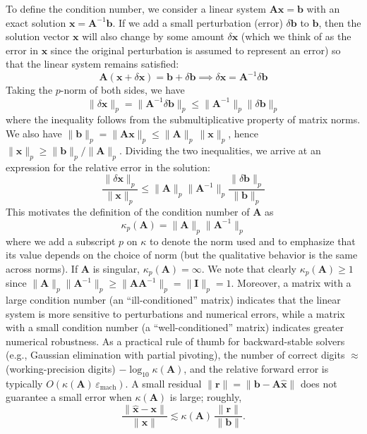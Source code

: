 To define the condition number, we consider a linear system $ \mathbf{A}\mathbf{x} = \mathbf{b} $ with an exact solution $ \mathbf{x} = \mathbf{A}^{-1}\mathbf{b} $. If we add a small perturbation (error) $\delta\mathbf{b}$ to $\mathbf{b}$, then the solution vector $\mathbf{x}$ will also change by some amount $\delta\mathbf{x}$ (which we think of as the error in $\mathbf{x}$ since the original perturbation is assumed to represent an error) so that the linear system remains satisfied:
\begin{equation*}
    \mathbf{A}\left(\mathbf{x} + \delta\mathbf{x}\right) = \mathbf{b} + \delta\mathbf{b}
    \implies 
    \delta\mathbf{x} = \mathbf{A}^{-1}\delta\mathbf{b}
\end{equation*}
Taking the $p$-norm of both sides, we have
\begin{equation*}
    \|\delta\mathbf{x}\|_p = \|\mathbf{A}^{-1}\delta\mathbf{b}\|_p \leq \|\mathbf{A}^{-1}\|_p \|\delta\mathbf{b}\|_p
\end{equation*}
where the inequality follows from the submultiplicative property of matrix norms. We also have $\|\mathbf{b}\|_p = \|\mathbf{A}\mathbf{x}\|_p \le \|\mathbf{A}\|_p \, \|\mathbf{x}\|_p$, hence $\|\mathbf{x}\|_p \ge \|\mathbf{b}\|_p/\|\mathbf{A}\|_p$. Dividing the two inequalities, we arrive at an expression for the relative error in the solution:
\begin{equation*}
    \frac{\|\delta\mathbf{x}\|_p}{\|\mathbf{x}\|_p} \leq \|\mathbf{A}\|_p \|\mathbf{A}^{-1}\|_p \frac{\|\delta\mathbf{b}\|_p}{\|\mathbf{b}\|_p}
\end{equation*}
This motivates the definition of the condition number of $\mathbf{A}$ as
\begin{equation*}
    \kappa_p(\mathbf{A}) = \|\mathbf{A}\|_p \|\mathbf{A}^{-1}\|_p
\end{equation*}
where we add a subscript $p$ on $\kappa$ to denote the norm used and to emphasize that its value depends on the choice of norm (but the qualitative behavior is the same across norms). If $\mathbf{A}$ is singular, $\kappa_p(\mathbf{A}) = \infty$. We note that clearly $\kappa_p(\mathbf{A}) \geq 1$ since $\|\mathbf{A}\|_p \|\mathbf{A}^{-1}\|_p \geq \|\mathbf{A} \mathbf{A}^{-1}\|_p = \|\mathbf{I}\|_p = 1$. Moreover, a matrix with a large condition number (an ``ill-conditioned'' matrix) indicates that the linear system is more sensitive to perturbations and numerical errors, while a matrix with a small condition number (a ``well-conditioned'' matrix) indicates greater numerical robustness. As a practical rule of thumb for backward-stable solvers (e.g., Gaussian elimination with partial pivoting), the number of correct digits $\approx$ (working-precision digits) $-\log_{10}\kappa(\mathbf{A})$, and the relative forward error is typically $O(\kappa(\mathbf{A})\,\varepsilon_{\mathrm{mach}})$. A small residual $\|\mathbf{r}\| = \|\mathbf{b}-\mathbf{A}\hat{\mathbf{x}}\|$ does not guarantee a small error when $\kappa(\mathbf{A})$ is large; roughly,
\[ \frac{\|\hat{\mathbf{x}}-\mathbf{x}\|}{\|\mathbf{x}\|} \lesssim \kappa(\mathbf{A})\,\frac{\|\mathbf{r}\|}{\|\mathbf{b}\|}. \]

